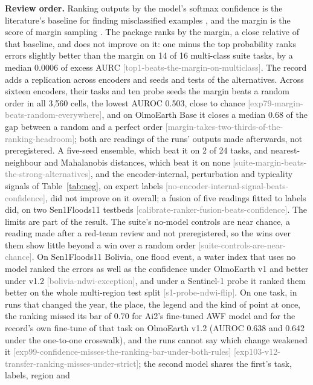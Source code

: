 \documentclass[11pt,a4paper]{article}
\newcommand{\claim}[1]{{\scriptsize\textsf{\textcolor{gray}{[#1]}}}}
\begin{document}
\textbf{Review order.} Ranking outputs by the model's softmax confidence is the literature's baseline for finding
misclassified examples \citep{hendrycks2017,jaeger2023}, and the margin is the score of margin sampling
\citep{scheffer2001}. The package ranks by the margin, a close relative of that baseline, and does not improve on it:
one minus the top probability ranks errors slightly better than the margin on 14 of 16 multi-class suite tasks, by a
median 0.0006 of excess AURC \claim{top1-beats-the-margin-on-multiclass}. The record adds a replication across encoders
and seeds and tests of the alternatives. Across sixteen encoders, their tasks and ten probe seeds the margin beats a
random order in all 3,560 cells, the lowest AUROC 0.503, close to chance \claim{exp79-margin-beats-random-everywhere},
and on OlmoEarth Base it closes a median 0.68 of the gap between a random and a perfect order
\claim{margin-takes-two-thirds-of-the-ranking-headroom}; both are readings of the runs' outputs made afterwards, not
preregistered. A five-seed ensemble, which beat it on 2 of 24 tasks, and nearest-neighbour and Mahalanobis distances,
which beat it on none \claim{suite-margin-beats-the-strong-alternatives}, and the encoder-internal, perturbation and
typicality signals of Table~\ref{tab:neg}, on expert labels \claim{no-encoder-internal-signal-beats-confidence}, did not
improve on it overall; a fusion of five readings fitted to labels did, on two Sen1Floods11 testbeds
\claim{calibrate-ranker-fusion-beats-confidence}. The limits are part of the result. The suite's no-model controls are
near chance, a reading made after a red-team review and not preregistered, so the wins over them show little beyond a
win over a random order \claim{suite-controls-are-near-chance}.
On Sen1Floods11 Bolivia, one flood event, a water index that uses no model ranked the errors as well as the confidence
under OlmoEarth v1 and better under v1.2 \claim{bolivia-ndwi-exception}, and under a Sentinel-1 probe it ranked them
better on the whole multi-region test split \claim{s1-probe-ndwi-flip}. On one task, in runs that changed the year, the place, the
legend and the kind of point at once, the ranking missed its bar of 0.70 for Ai2's fine-tuned AWF model and for the
record's own fine-tune of that task on OlmoEarth v1.2 (AUROC 0.638 and 0.642 under the one-to-one crosswalk), and the
runs cannot say which change weakened it \claim{exp99-confidence-misses-the-ranking-bar-under-both-rules}
\claim{exp103-v12-transfer-ranking-misses-under-strict}; the second model shares the first's task, labels, region and
\end{document}
